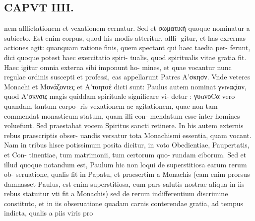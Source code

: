 \documentclass{article}
\begin{document}
\begin{pages}
\section*{CAPVT  IIII. }
\marginpar{[ p.209 ]}\pstart nem afflictationem et vexationem cernatur. Sed et σωματικὴ quoque nominatur a subiecto. Est enim corpus, quod his modis atteritur, affli- gitur, et has exrernas actiones agit: quanquam ratione finis, quem spectant qui haec taedia per- ferunt, dici quoque potest haec exercitatio spiri- tualis, quod spiritualis vitae gratia fit. Haec igitur omnia externa sibi imponunt ho- mines, et quae vocantur nunc regulae ordinis suscepti et professi, eas appellarunt Patres Α’σκησν. Vnde veteres Monachi et Μονάζοντες et Α’ταηταὲ dicti sunt: Paulus autem nominat γνιναςίαν, quod Α'σκνσις magis quiddam spirituale significare vi- detur : γυuνοCα vero quandam tantum corpo- ris vexationem ac agitationem, quae non tam commendat monasticum statum, quam illi con- mendatum esse inter homines voluefunt. Sed praestabat vocem Spiritus sancti retinere. In his autem externis rebus praescriptis obser- uandis versatur tota Monachismi essentia, quam vocant. Nam in tribus hisce potissimum posita dicitur, in voto Obedientiae, Paupertatis, et Con- tinentiae, tum matrimonii, tum certorum quo- rundam ciborum. Sed et illud quoque notandum est, Paulum hic non loqui de superstitiosa earum rerum ob- seruatione, qualis fit in Papatu, et praesertim a Monachis (eam enim prorsus damnasset Paulus, est enim superstitiosa, cum pars salutis nostrae aliqua in iis rebus statuitur vti fit a Monachis) sed de rerum indifferentium discrimine constituto, et in iis obseruatione quadam carnis conterendae gratia, ad tempus indicta, qualis a piis viris pro  \pend

\end{pages}
\end{document}
